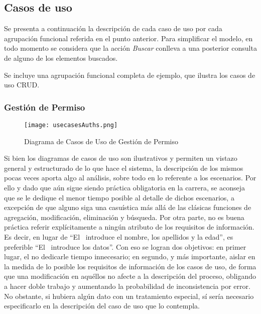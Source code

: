 \subsection{\forlnameref Casos de uso}
\label{sec:useCases}

Se presenta a continuación la descripción de cada caso de uso por cada agrupación funcional referida en el punto anterior. Para simplificar el modelo, en todo momento se considera que la acción \textit{Buscar} conlleva a una posterior consulta de alguno de los elementos buscados.

\begin{shaded}
Se incluye una agrupación funcional completa de ejemplo, que ilustra los casos de uso \ac{CRUD}.
\end{shaded}

\subsubsection*{Gestión de Permiso}

\begin{figure}[H]
\centering
\texttt{[image: usecasesAuths.png]}
\caption{Diagrama de Casos de Uso de Gestión de Permiso}
\label{fig:usecasesAuths}
\end{figure}

\begin{shaded}
Si bien los diagramas de casos de uso son ilustrativos y permiten un vistazo general y estructurado de lo que hace el sistema, la descripción de los mismos pocas veces aporta algo al análisis, sobre todo en lo referente a los escenarios. Por ello y dado que aún sigue siendo práctica obligatoria en la carrera, se aconseja que se le dedique el menor tiempo posible al detalle de dichos escenarios, a excepción de que alguno siga una casuística más allá de las clásicas funciones de agregación, modificación, eliminación y búsqueda. Por otra parte, no es buena práctica referir explícitamente a ningún atributo de los requisitos de información. Es decir, en lugar de ``El \actor\ introduce el nombre, los apellidos y la edad'', es preferible ``El \actor\ introduce los datos''. Con eso se logran dos objetivos: en primer lugar, el no dedicarle tiempo innecesario; en segundo, y más importante, aislar en la medida de lo posible los requisitos de información de los casos de uso, de forma que una modificación en aquéllos no afecte a la descripción del proceso, obligando a hacer doble trabajo y aumentando la probabilidad de inconsistencia por error. No obstante, si hubiera algún dato con un tratamiento especial, sí sería necesario especificarlo en la descripción del caso de uso que lo contempla.
\end{shaded}

